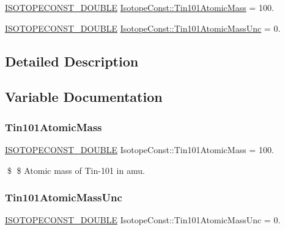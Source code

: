 \begin{DoxyCompactItemize}
\item 
\mbox{\hyperlink{group___isotope_const-_macros_ga8f45a7272ce02c0b4c65c44636ed719a}{I\+S\+O\+T\+O\+P\+E\+C\+O\+N\+S\+T\+\_\+\+D\+O\+U\+B\+LE}} \mbox{\hyperlink{group___isotope_const-_tin-_sn101_gac43e0fc671bc3af393a2677f745588d7}{Isotope\+Const\+::\+Tin101\+Atomic\+Mass}} = 100.
\item 
\mbox{\hyperlink{group___isotope_const-_macros_ga8f45a7272ce02c0b4c65c44636ed719a}{I\+S\+O\+T\+O\+P\+E\+C\+O\+N\+S\+T\+\_\+\+D\+O\+U\+B\+LE}} \mbox{\hyperlink{group___isotope_const-_tin-_sn101_gaa3fcaba075cea24fc7712f2dfcfdb1e5}{Isotope\+Const\+::\+Tin101\+Atomic\+Mass\+Unc}} = 0.
\end{DoxyCompactItemize}


\subsection{Detailed Description}


\subsection{Variable Documentation}
\mbox{\label{group___isotope_const-_tin-_sn101_gac43e0fc671bc3af393a2677f745588d7}} 
\subsubsection{\texorpdfstring{Tin101\+Atomic\+Mass}{Tin101AtomicMass}}
{\footnotesize\ttfamily \mbox{\hyperlink{group___isotope_const-_macros_ga8f45a7272ce02c0b4c65c44636ed719a}{I\+S\+O\+T\+O\+P\+E\+C\+O\+N\+S\+T\+\_\+\+D\+O\+U\+B\+LE}} Isotope\+Const\+::\+Tin101\+Atomic\+Mass = 100.}

\$ \$ Atomic mass of Tin-\/101 in amu. \mbox{\label{group___isotope_const-_tin-_sn101_gaa3fcaba075cea24fc7712f2dfcfdb1e5}} 
\subsubsection{\texorpdfstring{Tin101\+Atomic\+Mass\+Unc}{Tin101AtomicMassUnc}}
{\footnotesize\ttfamily \mbox{\hyperlink{group___isotope_const-_macros_ga8f45a7272ce02c0b4c65c44636ed719a}{I\+S\+O\+T\+O\+P\+E\+C\+O\+N\+S\+T\+\_\+\+D\+O\+U\+B\+LE}} Isotope\+Const\+::\+Tin101\+Atomic\+Mass\+Unc = 0.}


